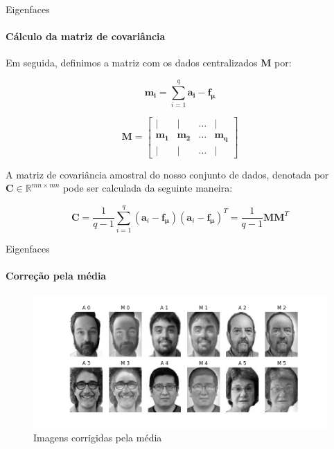 \documentclass[xcolor=dvipsnames,t,aspectratio=169]{beamer} %
\begin{document}
\begin{frame}[c]{Eigenfaces}
\framesubtitle{Cálculo da matriz de covariância}
     Em seguida, definimos a matriz com os dados centralizados $\boldsymbol{M}$ por:

            $$
            \boldsymbol{m_i} = \sum_{i=1}^{q} \boldsymbol{a_i} - \boldsymbol{f_\mu}
            $$        

            $$
            \boldsymbol{M} = \begin{bmatrix}
            \mid & \mid & \ldots  & \mid \\
            \boldsymbol{m_1} & \boldsymbol{m_2} & \ldots & \boldsymbol{m_q}\\
            \mid & \mid & \ldots  & \mid
            \end{bmatrix}
            $$

            
           A matriz de covariância amostral do nosso conjunto de dados, denotada por $\boldsymbol{C} \in  \mathds{R}^{mn \times mn}$ pode ser calculada da seguinte maneira:

            $$
            \boldsymbol{C} = \frac{1}{q-1} \sum_{i=1}^{q} (\boldsymbol{a}_i - \boldsymbol{f_\mu}) (\boldsymbol{a}_i - \boldsymbol{f_\mu})^T = \frac{1}{q-1} \boldsymbol{M} \boldsymbol{M}^T
            $$
    
\end{frame}

\begin{frame}[c]{Eigenfaces}
\framesubtitle{Correção pela média}

        \begin{figure}[H]
                  \centering
                  \includegraphics[width=1\textwidth]{img/MAIN_1.png}
                  \caption{Imagens corrigidas pela média}
                  \label{fig:exemplo}
            \end{figure}

\end{frame}
\end{document}
